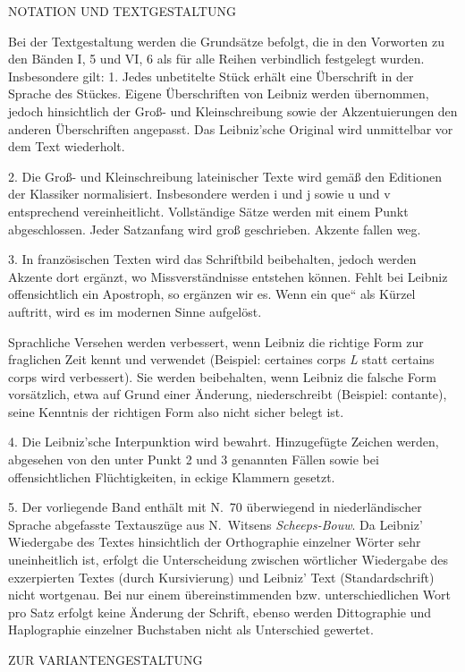 \newpage
\uppercase{Notation und Textgestaltung}\par\vspace{1.0ex}
Bei der Textgestaltung werden die Grunds\"{a}tze befolgt, die in den Vorworten zu den B\"{a}nden I, 5 und VI, 6 als f\"{u}r alle Reihen verbindlich festgelegt wurden. Insbesondere gilt:
1. Jedes unbetitelte St\"{u}ck erh\"{a}lt eine \"{U}berschrift in der Sprache des St\"{u}ckes. Eigene \"{U}berschriften von Leibniz werden \"{u}bernommen, jedoch hinsichtlich der Groß- und Kleinschreibung sowie der Akzentuierungen den anderen \"{U}berschriften angepasst. Das Leibniz'sche Original wird unmittelbar vor dem Text wiederholt.\par
2. Die Groß- und Kleinschreibung lateinischer Texte wird gem\"{a}ß den Editionen der Klassiker normalisiert. Insbesondere werden i und j sowie u und v entsprechend vereinheitlicht. Vollst\"{a}ndige S\"{a}tze werden mit einem Punkt abgeschlossen. Jeder Satzanfang wird groß geschrieben. Akzente fallen weg.\par
3. In franz\"{o}sischen Texten wird das Schriftbild beibehalten, jedoch werden Akzente dort erg\"{a}nzt, wo Missverst\"{a}ndnisse entstehen k\"{o}nnen. Fehlt bei Leibniz offensichtlich ein Apostroph, so erg\"{a}nzen wir es. Wenn ein \glqq que`` als K\"{u}rzel auftritt, wird es im modernen Sinne aufgel\"{o}st.\par
Sprachliche Versehen werden verbessert, wenn Leibniz die richtige Form zur fraglichen Zeit kennt und verwendet (Beispiel: certaines corps \textit{L} statt certains corps wird verbessert). Sie werden beibehalten, wenn Leibniz die falsche Form vors\"{a}tzlich, etwa auf Grund einer \"{A}nderung, niederschreibt (Beispiel: contante), seine Kenntnis der richtigen Form also nicht sicher belegt ist.\par
4. Die Leibniz'sche Interpunktion wird bewahrt. Hinzugef\"{u}gte Zeichen werden, abgesehen von den unter Punkt 2 und 3 genannten F\"{a}llen sowie bei offensichtlichen Fl\"{u}chtigkeiten, in eckige Klammern gesetzt.\par
5. Der vorliegende Band enth\"{a}lt mit N.~70 \"{u}berwiegend in niederl\"{a}ndischer Sprache abgefasste Textausz\"{u}ge aus N.~Witsens \textit{Scheeps-Bouw}. Da Leibniz’ Wiedergabe des Textes hinsichtlich der Orthographie einzelner W\"{o}rter sehr uneinheitlich ist, erfolgt die Unterscheidung zwischen w\"{o}rtlicher Wiedergabe des exzerpierten Textes (durch Kursivierung) und Leibniz’ Text (Standardschrift) nicht wortgenau. Bei nur einem \"{u}bereinstimmenden bzw. unterschiedlichen Wort pro Satz erfolgt keine \"{A}nderung der Schrift, ebenso werden Dittographie und Haplographie einzelner Buchstaben nicht als Unterschied gewertet.\par\vspace{3.0ex}
\clearpage
\uppercase{Zur Variantengestaltung}\par\vspace{1.0ex}

